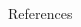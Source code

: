 \documentclass{beamer}
\begin{document}
\begingroup
\footnotesize
\begin{frame}[noframenumbering]{References}
\begin{thebibliography}{99}


\end{thebibliography}
\end{frame}
\endgroup
\end{document}
